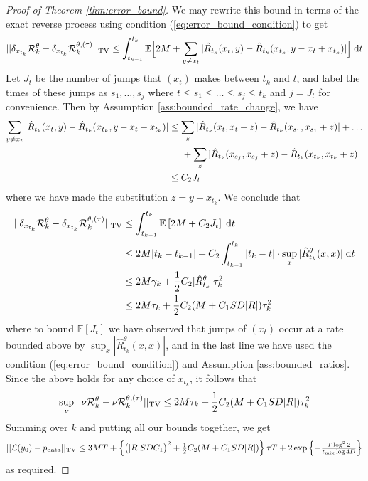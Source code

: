 \documentclass{article}
\begin{document}
\begin{proof}[Proof of Theorem \ref{thm:error_bound}]
We may rewrite this bound in terms of the exact reverse process using condition (\ref{eq:error_bound_condition}) to get
\begin{equation}
    ||\delta_{x_{t_k}} \mathcal{R}^{\theta}_k - \delta_{x_{t_k}} \mathcal{R}^{\theta, (\tau)}_k||_{\textup{TV}} \leq \int_{t_{k-1}}^{t_k} \mathbb{E} \Big[ 2M + \sum_{y \neq x_t} |\hat R_{t_k}(x_t, y) - \hat R_{t_k}(x_{t_k}, y - x_t + x_{t_k})| \Big] \; \mathrm{d} t 
\end{equation}
Let $J_t$ be the number of jumps that $(x_t)$ makes between $t_k$ and $t$, and label the times of these jumps as $s_1, \dots, s_j$ where $t \leq s_1 \leq \dots \leq s_j \leq t_k$ and $j = J_t$ for convenience. Then by Assumption \ref{ass:bounded_rate_change}, we have
\begin{align}
    \sum_{y \neq x_t} |\hat R_{t_k}(x_t, y) - \hat R_{t_k}(x_{t_k}, y - x_t + x_{t_k})| &\leq \sum_{z} |\hat R_{t_k}(x_t, x_t + z) - \hat R_{t_k}(x_{s_1}, x_{s_1} + z)| + \dots \\
    & \hspace{5mm} + \sum_{z} |\hat R_{t_k}(x_{s_j}, x_{s_j} + z) - \hat R_{t_k}(x_{t_k}, x_{t_k} + z)| \\
    & \leq C_2 J_t
\end{align}
where we have made the substitution $z = y - x_{t_k}$. We conclude that
\begin{align}
    ||\delta_{x_{t_k}} \mathcal{R}^{\theta}_k - \delta_{x_{t_k}} \mathcal{R}^{\theta, (\tau)}_k||_{\textup{TV}} &\leq \int_{t_{k-1}}^{t_k} \mathbb{E} \left[ 2M + C_2 J_t \right] \; \mathrm{d} t \\
    &\leq 2M |t_k - t_{k-1}| + C_2 \int_{t_{k-1}}^{t_k} |t_k - t| \cdot \sup_x |\hat R^\theta_{t_k}(x,x)| \; \mathrm{d} t \\
    &\leq 2M\gamma_k + \frac{1}{2}C_2|\hat R^\theta_{t_k}|\tau_k^2 \\
    &\leq 2 M \tau_k + \frac{1}{2} C_2(M + C_1 SD|R|) \tau_k^2
\end{align}
where to bound $\mathbb{E}[J_t]$ we have observed that jumps of $(x_t)$ occur at a rate bounded above by $\sup_x |\hat R^\theta_{t_k}(x,x)|$, and in the last line we have used the condition (\ref{eq:error_bound_condition}) and Assumption \ref{ass:bounded_ratios}. Since the above holds for any choice of $x_{t_k}$, it follows that
\begin{equation}
    \sup_{\nu} ||\nu \mathcal{R}^{\theta}_k - \nu \mathcal{R}^{\theta, (\tau)}_k||_{\textup{TV}} \leq 2 M \tau_k + \frac{1}{2} C_2(M + C_1 SD|R|) \tau_k^2
\end{equation}
Summing over $k$ and putting all our bounds together, we get
\begin{equation}
\textstyle
    ||\mathcal{L}(y_0) - p_{\textup{data}}||_{\textup{TV}} \leq 3MT + \left\{ \big(|R|SDC_1\big)^2 + \frac{1}{2} C_2(M + C_1 SD|R|) \right\} \tau T + 2 \exp \left \{ - \frac{T \log^2 2}{t_{\textup{mix}} \log 4D} \right \}
\end{equation}
as required.
\end{proof}
\end{document}
